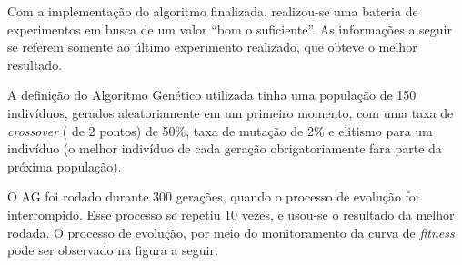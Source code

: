 \documentclass[11pt]{article}
\begin{document}
Com a implementação do algoritmo finalizada, realizou-se uma bateria de experimentos em busca de um valor ``bom o suficiente''. As informações a seguir se referem somente ao último experimento realizado, que obteve o melhor resultado.

A definição do Algoritmo Genético utilizada tinha uma população de 150 indivíduos, gerados aleatoriamente  em um primeiro momento, com uma taxa de \emph{crossover} ( de 2 pontos) de 50\%, taxa de mutação de 2\% e elitismo para um indivíduo (o melhor indivíduo de cada geração obrigatoriamente fara parte da próxima população). 

O AG foi rodado durante 300 gerações, quando o processo de evolução foi interrompido. Esse processo se repetiu 10 vezes, e usou-se o resultado da melhor rodada. O processo de evolução, por meio do monitoramento da curva de \emph{fitness} pode ser observado na figura a seguir.

    \begin{center}
    \end{center}
    { \hspace*{\fill} \\}
    
\end{document}

